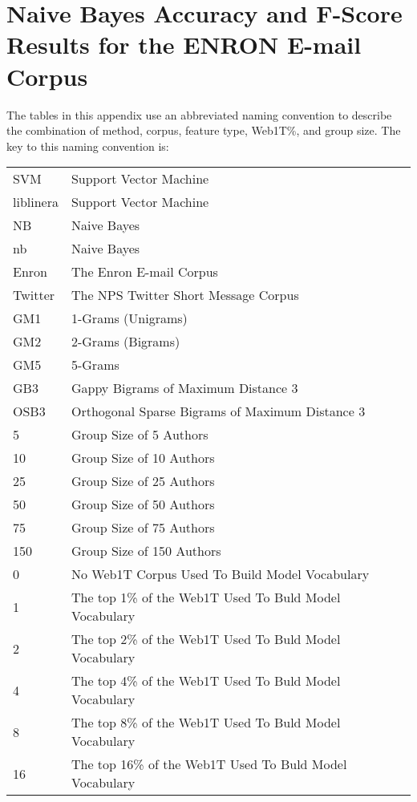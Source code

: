 \chapter{Naive Bayes Accuracy and F-Score Results for the ENRON E-mail Corpus}

The tables in this appendix use an abbreviated naming convention to describe the combination of method, corpus, feature type, Web1T\%, and group size.  The key to this naming convention is:

\begin{center}
\begin{table}[htbp!]
	\begin{center}
	\begin{tabular}{ll}
	SVM & Support Vector Machine\\
	liblinera & Support Vector Machine\\
	NB & Naive Bayes\\
	nb & Naive Bayes\\
	
	Enron & The Enron E-mail Corpus\\
	Twitter & The NPS Twitter Short Message Corpus\\
	
	GM1 & 1-Grams (Unigrams)\\
	GM2 & 2-Grams (Bigrams)\\
	GM5 & 5-Grams\\
	GB3 & Gappy Bigrams of Maximum Distance 3\\
	OSB3 & Orthogonal Sparse Bigrams of Maximum Distance 3\\
		
	5 & Group Size of 5 Authors\\
	10 & Group Size of 10 Authors\\
	25 & Group Size of 25 Authors\\
	50 & Group Size of 50 Authors\\
	75 & Group Size of 75 Authors\\
	150 & Group Size of 150 Authors\\
	
	0 & No Web1T Corpus Used To Build Model Vocabulary\\
	1 & The top 1\% of the Web1T Used To Buld Model Vocabulary\\
	2 & The top 2\% of the Web1T Used To Buld Model Vocabulary\\
	4 & The top 4\% of the Web1T Used To Buld Model Vocabulary\\
	8 & The top 8\% of the Web1T Used To Buld Model Vocabulary\\
	16 & The top 16\% of the Web1T Used To Buld Model Vocabulary\\
	\end{tabular}
	\end{center}
\end{table}
\end{center}


